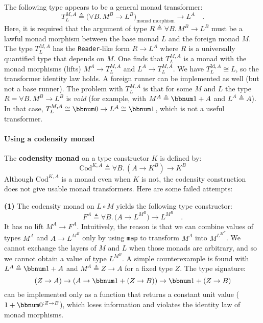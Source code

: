 The following type appears to be a general monad transformer:
\[
T_{L}^{M,A}\triangleq\big(\forall B.\,M^{B}\rightarrow L^{B}\big)_{\text{monad morphism}}\rightarrow L^{A}\quad.
\]
Here, it is required that the argument of type $R\triangleq\forall B.\,M^{B}\rightarrow L^{B}$
must be a lawful monad morphism between the base monad $L$ and the
foreign monad $M$. The type $T_{L}^{M,A}$ has the \lstinline!Reader!-like
form $R\rightarrow L^{A}$ where $R$ is a universally quantified
type that depends on $M$. One finds that $T_{L}^{M,A}$ is a monad
with the monad morphisms (lifts) $M^{A}\rightarrow T_{L}^{M,A}$ and
$L^{A}\rightarrow T_{L}^{M,A}$. We have $T_{L}^{\text{Id},A}\cong L$,
so the transformer identity law holds. A foreign runner can be implemented
as well (but not a base runner). The problem with $T_{L}^{M,A}$ is
that for some $M$ and $L$ the type $R=\forall B.\,M^{B}\rightarrow L^{B}$
is \emph{void} (for example, with $M^{A}\triangleq\bbnum 1+A$ and
$L^{A}\triangleq A$). In that case, $T_{L}^{M,A}\cong\bbnum 0\rightarrow L^{A}\cong\bbnum 1$,
which is not a useful transformer.

\paragraph{Using a codensity monad}

The \textbf{codensity monad} on a type
constructor $K$ is defined by:
\[
\text{Cod}^{K,A}\triangleq\forall B.\,(A\rightarrow K^{B})\rightarrow K^{B}
\]
Although $\text{Cod}^{K,A}$ is a monad even when $K$ is not, the
codensity construction does not give usable monad transformers. Here
are some failed attempts:

\textbf{(1)} The codensity monad on $L\circ M$ yields the following
type constructor:
\[
F^{A}\triangleq\forall B.\,\big(A\rightarrow L^{M^{B}}\big)\rightarrow L^{M^{B}}\quad.
\]
It has no lift $M^{A}\rightarrow F^{A}$. Intuitively, the reason
is that we can combine values of types $M^{A}$ and $A\rightarrow L^{M^{B}}$
only by using \lstinline!map! to transform $M^{A}$ into $M^{L^{M^{B}}}$.
We cannot exchange the layers of $M$ and $L$ when those monads are
arbitrary, and so we cannot obtain a value of type $L^{M^{B}}$. A
simple counterexample is found with $L^{A}\triangleq\bbnum 1+A$ and
$M^{A}\triangleq Z\rightarrow A$ for a fixed type $Z$. The type
signature:
\[
(Z\rightarrow A)\rightarrow(A\rightarrow\bbnum 1+(Z\rightarrow B))\rightarrow\bbnum 1+(Z\rightarrow B)
\]
can be implemented only as a function that returns a constant unit
value ($1+\bbnum 0^{:Z\rightarrow B}$), which loses information and
violates the identity law of monad morphisms.

